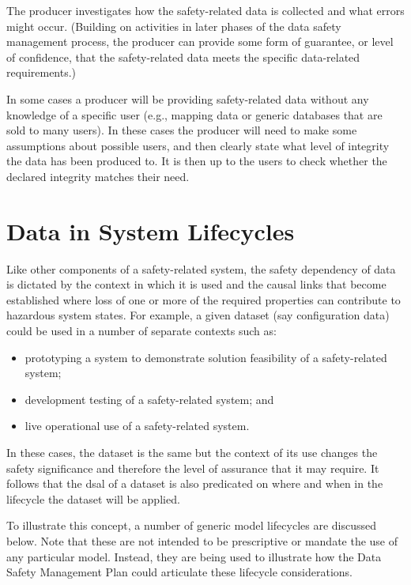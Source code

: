 The producer investigates how the safety-related data is collected and what errors might occur. (Building on activities in later phases of the data safety management process, the producer can provide some form of guarantee, or level of confidence, that the safety-related data meets the specific data-related requirements.)

In some cases a producer will be providing safety-related data without any knowledge of a specific user (e.g., mapping data or generic \glspl{database} that are sold to many users). In these cases the producer will need to make some assumptions about possible users, and then clearly state what level of \gls{integrity} the data has been produced to. It is then up to the users to check whether the declared \gls{integrity} matches their need.

\section{Data in System Lifecycles}
Like other components of a safety-related system, the safety dependency of data is dictated by the context in which it is used and the causal links that become established where loss of one or more of the required properties can contribute to hazardous system states. For example, a given \gls{dataset} (say \gls{configuration data}) could be used in a number of separate contexts such as:
\begin{itemize}
  \item prototyping a system to demonstrate solution feasibility of a safety-related system;
  \item development testing of a safety-related system; and
  \item live operational use of a safety-related system.
\end{itemize}

In these cases, the \gls{dataset} is the same but the context of its use changes the safety significance and therefore the level of assurance that it may require. It follows that the \gls{dsal} of a \gls{dataset} is also predicated on where and when in the lifecycle the \gls{dataset} will be applied. 

To illustrate this concept, a number of generic model lifecycles are discussed below. Note that these are not intended to be prescriptive or mandate the use of any particular model. Instead, they are being used to illustrate how the Data Safety Management Plan could articulate these lifecycle considerations.

